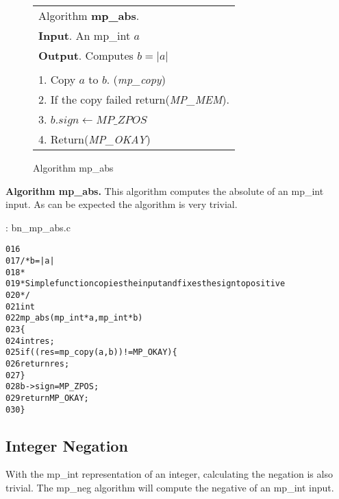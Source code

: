 \documentclass[b5paper]{book}
\begin{document}
\begin{figure}[here]
\begin{center}
\begin{tabular}{l}
\hline Algorithm \textbf{mp\_abs}. \\
\textbf{Input}.   An mp\_int $a$ \\
\textbf{Output}.  Computes $b = \vert a \vert$ \\
\hline \\
1.  Copy $a$ to $b$.  (\textit{mp\_copy}) \\
2.  If the copy failed return(\textit{MP\_MEM}). \\
3.  $b.sign \leftarrow MP\_ZPOS$ \\
4.  Return(\textit{MP\_OKAY}) \\
\hline
\end{tabular}
\end{center}
\caption{Algorithm mp\_abs}
\end{figure}

\textbf{Algorithm mp\_abs.}
This algorithm computes the absolute of an mp\_int input.  As can be expected the algorithm is very trivial.

\vspace{+3mm}\begin{small}
\hspace{-5.1mm}{\bf File}: bn\_mp\_abs.c
\vspace{-3mm}
\begin{alltt}
016   
017   /* b = |a| 
018    *
019    * Simple function copies the input and fixes the sign to positive
020    */
021   int
022   mp_abs (mp_int * a, mp_int * b)
023   \{
024     int     res;
025     if ((res = mp_copy (a, b)) != MP_OKAY) \{
026       return res;
027     \}
028     b->sign = MP_ZPOS;
029     return MP_OKAY;
030   \}
\end{alltt}
\end{small}

\subsection{Integer Negation}
With the mp\_int representation of an integer, calculating the negation is also trivial.  The mp\_neg algorithm will compute
the negative of an mp\_int input.
\end{document}
